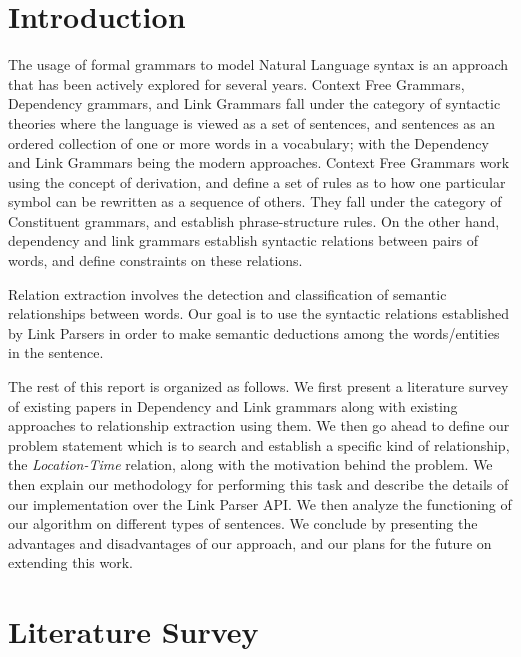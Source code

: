 \documentclass[runningheads,a4paper,11pt]{llncs}
\begin{document}
\section{Introduction}
 The usage of formal grammars to model Natural Language syntax is an approach that has been actively explored for several years.  Context Free Grammars, Dependency grammars, and 
 Link Grammars fall under the category of syntactic theories where the language is viewed as a set of sentences, and sentences as an ordered collection of one or more words
 in a vocabulary; with the Dependency and Link Grammars being the modern approaches. Context Free Grammars work using the concept of 
 derivation, and define a set of rules as to how one particular symbol can be rewritten as a sequence of others. They fall under the category of 
 Constituent grammars, and establish phrase-structure rules. On the other hand, dependency and link grammars
 establish syntactic relations between pairs of words, and define constraints on these relations. 
 
 Relation extraction involves the detection and classification of semantic relationships between words. Our goal is to use the syntactic relations established by 
 Link Parsers in order to make semantic deductions among the words/entities in the sentence.
 
 The rest of this report is organized as follows. We first present a literature survey of existing papers in Dependency and Link grammars along with existing approaches 
 to relationship extraction using them. We then go ahead to define our problem statement which is to search and establish a specific kind of relationship, the 
 \textit{Location-Time} relation, along with the motivation behind the problem. We then explain our methodology for performing this task and describe the
details of our implementation over the Link Parser API. We then analyze the functioning of our algorithm on different types of sentences. We conclude by 
presenting the advantages and disadvantages of our approach, and our plans for the future on extending this work.

\section{Literature Survey}
 
\end{document}
